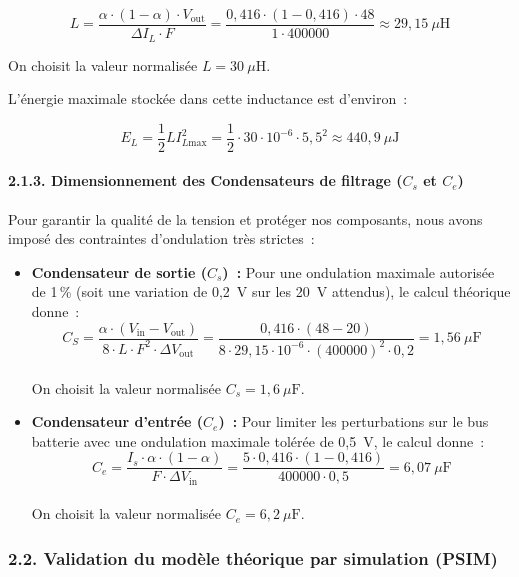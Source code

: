 $$ L = \frac{\alpha \cdot (1-\alpha) \cdot V_{\text{out}}}{\Delta I_L \cdot F} = \frac{0,416 \cdot (1-0,416) \cdot 48}{1 \cdot 400000} \approx 29,15~\mu\text{H} $$

On choisit la valeur normalisée $L = 30~\mu\text{H}$.

L'énergie maximale stockée dans cette inductance est d'environ~:

$$ E_L = \frac{1}{2} L I_{L\text{max}}^2 = \frac{1}{2} \cdot 30\cdot 10^{-6} \cdot 5,5^2 \approx 440,9~\mu\text{J} $$

\paragraph{2.1.3. Dimensionnement des Condensateurs de filtrage ($C_s$ et $C_e$)}
Pour garantir la qualité de la tension et protéger nos composants, nous avons imposé des contraintes d'ondulation très strictes~:

\begin{itemize}
    \item \textbf{Condensateur de sortie ($C_s$)~:} Pour une ondulation maximale autorisée de 1\,\% (soit une variation de 0,2~V sur les 20~V attendus), le calcul théorique donne~: \\
    $$ C_S = \frac{\alpha \cdot (V_{\text{in}} - V_{\text{out}})}{8 \cdot L \cdot F^2 \cdot \Delta V_{\text{out}}} = \frac{0,416 \cdot (48 - 20)}{8 \cdot 29,15 \cdot 10^{-6} \cdot (400000)^2 \cdot 0,2} = 1,56~\mu\text{F} $$ \\
    On choisit la valeur normalisée $C_s = 1,6~\mu\text{F}$.
    \item \textbf{Condensateur d'entrée ($C_e$)~:} Pour limiter les perturbations sur le bus batterie avec une ondulation maximale tolérée de 0,5~V, le calcul donne~: \\
    $$ C_e = \frac{I_s \cdot \alpha \cdot (1 - \alpha)}{F \cdot \Delta V_{\text{in}}} = \frac{5 \cdot 0,416 \cdot (1-0,416)}{400000 \cdot 0,5} = 6,07~\mu\text{F} $$ \\
    On choisit la valeur normalisée $C_e = 6,2~\mu\text{F}$.
\end{itemize}

\subsubsection*{2.2. Validation du modèle théorique par simulation (PSIM)}

